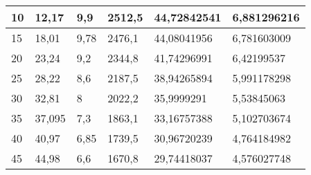 \begin{table}[ht!]
\begin{tabular}{|l|l|l|l|l|l|}
    \rowcolor[HTML]{E2EFDA} 
    10                                    & 12,17                                  & 9,9                                                & 2512,5                                   & 44,72842541                                          & 6,881296216                                    \\ \hline
    \rowcolor[HTML]{C6E0B4} 
    15                                    & 18,01                                  & 9,78                                               & 2476,1                                   & 44,08041956                                          & 6,781603009                                    \\ \hline
    \rowcolor[HTML]{E2EFDA} 
    20                                    & 23,24                                  & 9,2                                                & 2344,8                                   & 41,74296991                                          & 6,42199537                                     \\ \hline
    \rowcolor[HTML]{C6E0B4} 
    25                                    & 28,22                                  & 8,6                                                & 2187,5                                   & 38,94265894                                          & 5,991178298                                    \\ \hline
    \rowcolor[HTML]{E2EFDA} 
    30                                    & 32,81                                  & 8                                                  & 2022,2                                   & 35,9999291                                           & 5,53845063                                     \\ \hline
    \rowcolor[HTML]{C6E0B4} 
    35                                    & 37,095                                 & 7,3                                                & 1863,1                                   & 33,16757388                                          & 5,102703674                                    \\ \hline
    \rowcolor[HTML]{E2EFDA} 
    40                                    & 40,97                                  & 6,85                                               & 1739,5                                   & 30,96720239                                          & 4,764184982                                    \\ \hline
    \rowcolor[HTML]{C6E0B4} 
    45                                    & 44,98                                  & 6,6                                                & 1670,8                                   & 29,74418037                                          & 4,576027748                                    \\ \hline

\end{tabular}
\end{table}
